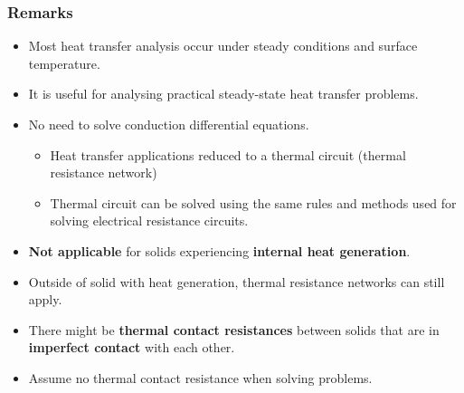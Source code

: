 \documentclass[11pt]{article}
\begin{document}
\subsubsection{Remarks}
\label{sec:orgb783643}
\begin{itemize}
\item Most heat transfer analysis occur under steady conditions and surface temperature.
\item It is useful for analysing practical steady-state heat transfer problems.
\item No need to solve conduction differential equations.
\begin{itemize}
\item Heat transfer applications reduced to a thermal circuit (thermal resistance network)
\item Thermal circuit can be solved using the same rules and methods used for solving electrical resistance circuits.
\end{itemize}
\item \textbf{Not applicable} for solids experiencing \textbf{internal heat generation}.
\item Outside of solid with heat generation, thermal resistance networks can still apply.
\item There might be \textbf{thermal contact resistances} between solids that are in \textbf{imperfect contact} with each other.
\item Assume no thermal contact resistance when solving problems.
\end{itemize}

 \newpage
\end{document}
